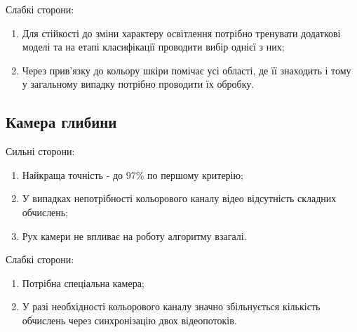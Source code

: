 Слабкі сторони:
\begin{enumerate}
	\item Для стійкості до зміни характеру освітлення потрібно тренувати додаткові моделі та на етапі класифікації проводити вибір однієї з них;
	\item Через прив'язку до кольору шкіри помічає усі області, де її знаходить і тому у загальному випадку потрібно проводити їх обробку.
\end{enumerate}

\subsection{Камера глибини}

Сильні сторони:
\begin{enumerate}
	\item Найкраща точність - до 97\% по першому критерію;
	\item У випадках непотрібності кольорового каналу відео відсутність складних обчислень;
	\item Рух камери не впливає на роботу алгоритму взагалі.
\end{enumerate}

Слабкі сторони:
\begin{enumerate}
	\item Потрібна спеціальна камера;
	\item У разі необхідності кольорового каналу значно збільнується кількість обчислень через синхронізацію двох відеопотоків.
\end{enumerate}